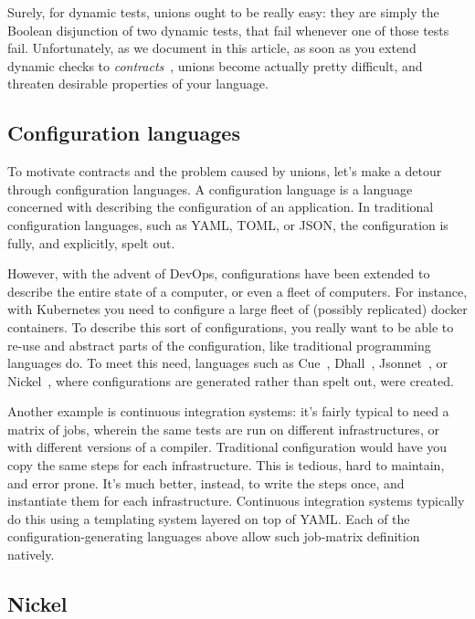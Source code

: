 \documentclass[sigplan,screen,10pt]{acmart}
\begin{document}
Surely, for dynamic tests, unions ought to be really easy: they
are simply the Boolean disjunction of two dynamic tests, that fail
whenever one of those tests fail.
Unfortunately, as we document in this article, as soon as you extend
dynamic checks to \emph{contracts}~\cite{FindlerFelleisenHOContracts},
unions become actually pretty difficult, and threaten desirable
properties of your language.

\subsection{Configuration languages}

To motivate contracts and the problem caused by unions, let's make a
detour through configuration languages.
%
A configuration language is a language concerned with describing the
configuration of an application. In traditional configuration
languages, such as YAML, TOML, or JSON, the configuration is fully,
and explicitly, spelt out.

However, with the advent of DevOps, configurations have been extended
to describe the entire state of a computer, or even a fleet of
computers. For instance, with Kubernetes you need to configure a large
fleet of (possibly replicated) docker containers. To describe this
sort of configurations, you really want to be able to re-use and
abstract parts of the configuration, like traditional programming
languages do. To meet this need, languages such as Cue~\cite{cueLang},
Dhall~\cite{dhallLang}, Jsonnet~\cite{jsonnetLang}, or Nickel~\cite{NickelRepo}, where
configurations are generated rather than spelt out, were created.

Another example is continuous integration systems: it's fairly typical
to need a matrix of jobs, wherein the same tests are run on different
infrastructures, or with different versions of a compiler. Traditional
configuration would have you copy the same steps for each
infrastructure. This is tedious, hard to maintain, and error
prone. It's much better, instead, to write the steps once, and
instantiate them for each infrastructure. Continuous integration
systems typically do this using a templating system layered on top of
YAML. Each of the configuration-generating languages above allow such
job-matrix definition natively.

\subsection{Nickel}
\end{document}
